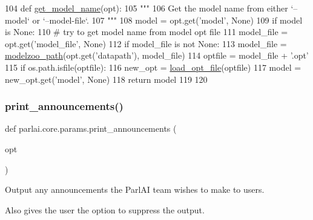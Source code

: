 \begin{DoxyCode}
104 \textcolor{keyword}{def }\hyperlink{namespaceparlai_1_1core_1_1params_a6d160324f6af84562334fd0698141074}{get\_model\_name}(opt):
105     \textcolor{stringliteral}{"""}
106 \textcolor{stringliteral}{    Get the model name from either `--model` or `--model-file`.}
107 \textcolor{stringliteral}{    """}
108     model = opt.get(\textcolor{stringliteral}{'model'}, \textcolor{keywordtype}{None})
109     \textcolor{keywordflow}{if} model \textcolor{keywordflow}{is} \textcolor{keywordtype}{None}:
110         \textcolor{comment}{# try to get model name from model opt file}
111         model\_file = opt.get(\textcolor{stringliteral}{'model\_file'}, \textcolor{keywordtype}{None})
112         \textcolor{keywordflow}{if} model\_file \textcolor{keywordflow}{is} \textcolor{keywordflow}{not} \textcolor{keywordtype}{None}:
113             model\_file = \hyperlink{namespaceparlai_1_1agents_1_1legacy__agents_1_1seq2seq_1_1utils__v0_a5fbd3301b67f00d6d146fb01c7cd7626}{modelzoo\_path}(opt.get(\textcolor{stringliteral}{'datapath'}), model\_file)
114             optfile = model\_file + \textcolor{stringliteral}{'.opt'}
115             \textcolor{keywordflow}{if} os.path.isfile(optfile):
116                 new\_opt = \hyperlink{namespaceparlai_1_1utils_1_1misc_a7c97ef3250327bc549ac652a481be0cf}{load\_opt\_file}(optfile)
117                 model = new\_opt.get(\textcolor{stringliteral}{'model'}, \textcolor{keywordtype}{None})
118     \textcolor{keywordflow}{return} model
119 
120 
\end{DoxyCode}
\mbox{\label{namespaceparlai_1_1core_1_1params_afd1a47c94990168ea9e70d894a79bd2c}} 
\subsubsection{\texorpdfstring{print\+\_\+announcements()}{print\_announcements()}}
{\footnotesize\ttfamily def parlai.\+core.\+params.\+print\+\_\+announcements (\begin{DoxyParamCaption}\item[{}]{opt }\end{DoxyParamCaption})}

\begin{DoxyVerb}Output any announcements the ParlAI team wishes to make to users.

Also gives the user the option to suppress the output.
\end{DoxyVerb}
 

